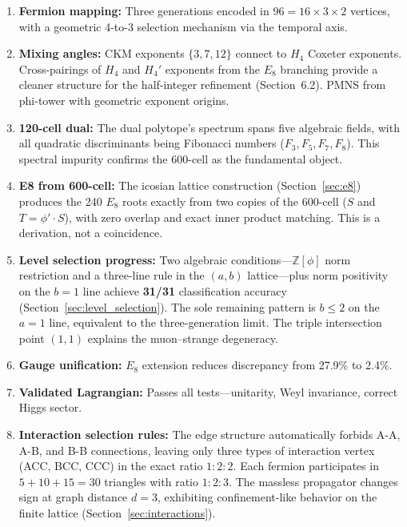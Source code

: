 \documentclass[12pt,a4paper]{article}
\begin{document}
\begin{enumerate}
    \item \textbf{Fermion mapping:} Three generations encoded in $96 = 16 \times 3 \times 2$ vertices, with a geometric 4-to-3 selection mechanism via the temporal axis.

    \item \textbf{Mixing angles:} CKM exponents $\{3, 7, 12\}$ connect to $H_4$ Coxeter exponents. Cross-pairings of $H_4$ and $H_4'$ exponents from the $E_8$ branching provide a cleaner structure for the half-integer refinement (Section~6.2). PMNS from phi-tower with geometric exponent origins.

    \item \textbf{120-cell dual:} The dual polytope's spectrum spans five algebraic fields, with all quadratic discriminants being Fibonacci numbers ($F_3, F_5, F_7, F_8$). This spectral impurity confirms the 600-cell as the fundamental object.

    \item \textbf{E8 from 600-cell:} The icosian lattice construction (Section~\ref{sec:e8}) produces the 240 $E_8$ roots exactly from two copies of the 600-cell ($S$ and $T = \phi' \cdot S$), with zero overlap and exact inner product matching. This is a derivation, not a coincidence.

    \item \textbf{Level selection progress:} Two algebraic conditions---$\mathbb{Z}[\phi]$ norm restriction and a three-line rule in the $(a,b)$ lattice---plus norm positivity on the $b=1$ line achieve \textbf{31/31} classification accuracy (Section~\ref{sec:level_selection}). The sole remaining pattern is $b \leq 2$ on the $a=1$ line, equivalent to the three-generation limit. The triple intersection point $(1,1)$ explains the muon--strange degeneracy.

    \item \textbf{Gauge unification:} $E_8$ extension reduces discrepancy from 27.9\% to 2.4\%.

    \item \textbf{Validated Lagrangian:} Passes all tests---unitarity, Weyl invariance, correct Higgs sector.

    \item \textbf{Interaction selection rules:} The edge structure automatically forbids A-A, A-B, and B-B connections, leaving only three types of interaction vertex (ACC, BCC, CCC) in the exact ratio $1:2:2$. Each fermion participates in $5 + 10 + 15 = 30$ triangles with ratio $1:2:3$. The massless propagator changes sign at graph distance $d = 3$, exhibiting confinement-like behavior on the finite lattice (Section~\ref{sec:interactions}).


\end{enumerate}
\end{document}
